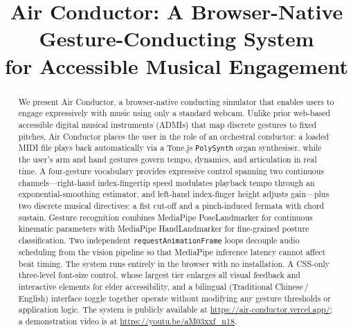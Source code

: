 \documentclass[conference]{IEEEtran}
\begin{document}
\title{Air Conductor: A Browser-Native Gesture-Conducting System\\
for Accessible Musical Engagement}

\author{
}

\maketitle

\begin{abstract}
We present Air Conductor, a browser-native conducting simulator that
enables users to engage expressively with music using only a standard
webcam. Unlike prior web-based accessible digital musical instruments
(ADMIs) that map discrete gestures to fixed pitches, Air Conductor
places the user in the role of an orchestral conductor: a loaded MIDI
file plays back automatically via a Tone.js \texttt{PolySynth} organ
synthesiser, while the user's arm and hand gestures govern tempo,
dynamics, and articulation in real time. A four-gesture vocabulary
provides expressive control spanning two continuous
channels---right-hand index-fingertip speed modulates playback tempo
through an exponential-smoothing estimator, and left-hand
index-finger height adjusts gain---plus two discrete musical
directives: a fist cut-off and a pinch-induced fermata with chord
sustain. Gesture recognition combines MediaPipe PoseLandmarker for
continuous kinematic parameters with MediaPipe HandLandmarker for
fine-grained posture classification. Two independent
\texttt{requestAnimationFrame} loops decouple audio scheduling from the
vision pipeline so that MediaPipe inference latency cannot affect beat
timing. The system runs entirely in the browser with no installation.
A CSS-only three-level font-size control, whose largest tier enlarges
all visual feedback and interactive elements for elder accessibility,
and a bilingual (Traditional Chinese\,/\,English) interface toggle
together operate without modifying any gesture thresholds or
application logic.
The system is publicly available at
\url{https://air-conductor.vercel.app/}; a demonstration video is at
\url{https://youtu.be/aM03xxf_n18}.
\end{abstract}
\end{document}
